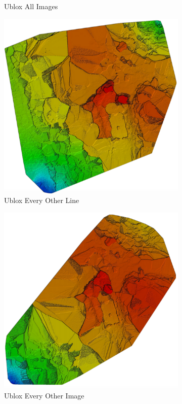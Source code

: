 \documentclass{article}
\begin{document}
\begin{figure}
\begin{subfigure}{.33\textwidth}
  \caption{Ublox All Images}
  \label{fig:sub1}
\end{subfigure}%
\begin{subfigure}{.33\textwidth}
  \centering
  \includegraphics[width=.72\linewidth]{images/DSM/ublox_every_other_line.png}
  \caption{Ublox Every Other Line}
  \label{fig:sub2}
\end{subfigure}
\begin{subfigure}{.33\textwidth}
  \centering
  \includegraphics[width=.72\linewidth]{images/DSM/ublox_every_other_image.png}
  \caption{Ublox Every Other Image}
  \label{fig:sub1}
\end{subfigure}%
\begin{subfigure}{.33\textwidth}
  \centering

\end{subfigure}
\end{figure}
\end{document}
